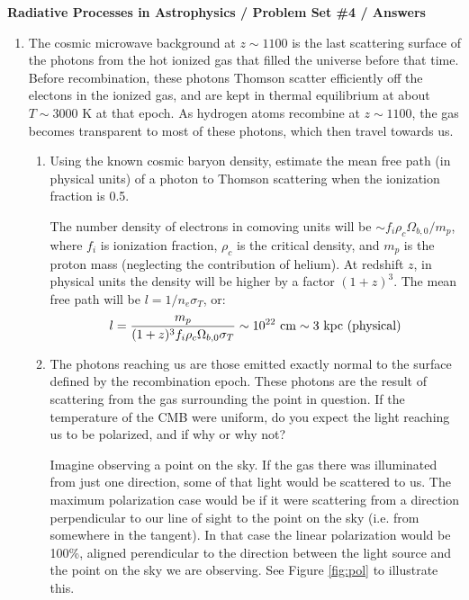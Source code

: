 \documentclass[11pt, preprint]{article}
\begin{document}
\begin{center}
  {\bf Radiative Processes in Astrophysics / Problem Set \#4 /
    Answers}
\end{center}


\begin{enumerate}
\item The cosmic microwave background at $z\sim 1100$ is the last
  scattering surface of the photons from the hot ionized gas that
  filled the universe before that time. Before recombination, these
  photons Thomson scatter efficiently off the electons in the ionized
  gas, and are kept in thermal equilibrium at about $T\sim 3000$ K at
  that epoch. As hydrogen atoms recombine at $z\sim 1100$, the gas
  becomes transparent to most of these photons, which then travel
  towards us.
\begin{enumerate}
\item Using the known cosmic baryon density, estimate the mean free
  path (in physical units) of a photon to Thomson scattering when the
  ionization fraction is 0.5.

  \begin{answer}
    The number density of electrons in comoving units will be $\sim
    f_i \rho_c \Omega_{b,0} / m_p$, where $f_i$ is ionization
    fraction, $\rho_c$ is the critical density, and $m_p$ is the
    proton mass (neglecting the contribution of helium). At redshift
    $z$, in physical units the density will be higher by a factor
    $(1+z)^3$. The mean free path will be $l = 1/n_e \sigma_T$, or:
    \begin{equation}
      l = \frac{m_p}{(1+z)^3 f_i \rho_c \Omega_{b,0} \sigma_T} \sim
      10^{22} {\rm ~cm} \sim 3 {\rm ~kpc~(physical)}
    \end{equation}
  \end{answer}
\item The photons reaching us are those emitted exactly normal to the
  surface defined by the recombination epoch. These photons are the
  result of scattering from the gas surrounding the point in
  question. If the temperature of the CMB were uniform, do you expect
  the light reaching us to be polarized, and if why or why not?

  \begin{answer}
    Imagine observing a point on the sky.  If the gas there was
    illuminated from just one direction, some of that light would be
    scattered to us.  The maximum polarization case would be if it
    were scattering from a direction perpendicular to our line of
    sight to the point on the sky (i.e. from somewhere in the
    tangent). In that case the linear polarization would be 100\%,
    aligned perendicular to the direction between the light source and
    the point on the sky we are observing. See Figure \ref{fig:pol} to
    illustrate this.
    

\end{answer}
\end{enumerate}
\end{enumerate}
\end{document}
